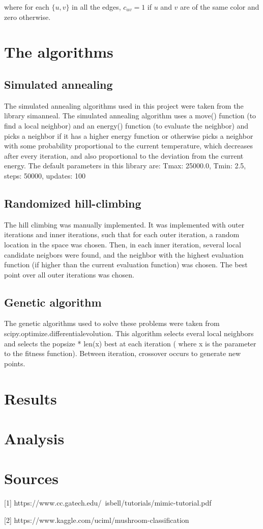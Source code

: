 \documentclass[11pt]{article}
\begin{document}
            where for each $\{u, v\}$ in all the edges, $c_{uv} = 1$ if $u$
            and $v$ are of the same color and zero otherwise.

            \section{The algorithms}

            \subsection{Simulated annealing}
            The simulated annealing algorithms used in this project were taken from the library simanneal. The simulated
            annealing algorithm uses a move() function (to find a local neighbor) and an energy() function (to evaluate
            the neighbor) and picks a neighbor if it has a higher energy function or otherwise picks a neighbor with some probability
            proportional to the current temperature, which decreases after every iteration, and also proportional
            to the deviation from the current energy. The default parameters in this library are:
            Tmax: 25000.0, Tmin: 2.5, steps: 50000, updates: 100

            \subsection{Randomized hill-climbing}
            The hill climbing was manually implemented. It was implemented with outer iterations and inner
            iterations, such that for each outer iteration, a random location in the space was chosen. Then,
            in each inner iteration, several local candidate neigbors were found, and the neighbor with the highest evaluation function
            (if higher than the current evaluation function) was chosen. The best point over all outer iterations was
            chosen.

            \subsection{Genetic algorithm}
            The genetic algorithms used to solve these problems were taken from scipy.optimize.differentialevolution.
            This algorithm selects everal local neighbors and selects the popsize * len(x) best at each iteration (
                where x is the parameter to the fitness function). Between iteration, crossover occurs to generate new points.




        
        \section{Results}

        \section{Analysis}

       

        \section{Sources}

        [1] https://www.cc.gatech.edu/~isbell/tutorials/mimic-tutorial.pdf

        [2] https://www.kaggle.com/uciml/mushroom-classification

    
\end{document}
